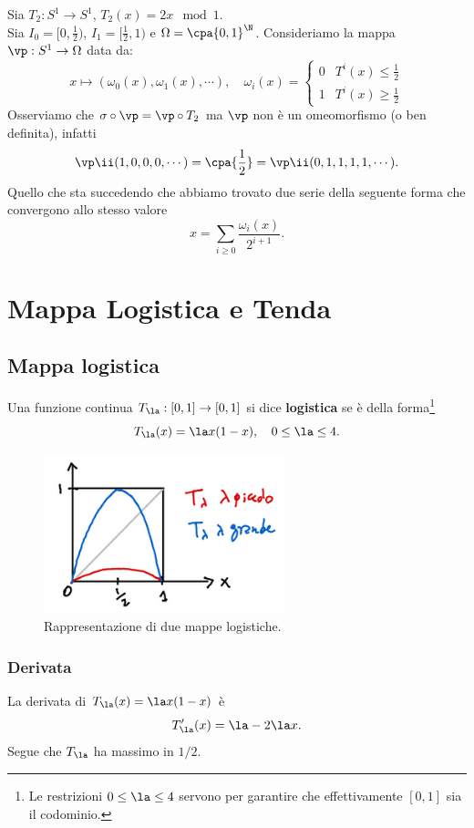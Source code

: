 \begin{example}
Sia $T_2:S^1\to S^1$, $T_2(x)=2x\mod 1$.\\
Sia $I_0=[0,\frac12)$, $I_1=[\frac12,1)$ e $\Omega=\cpa{0,1}^\N$. Consideriamo la mappa $\vp:S^1\to \Omega$ data da:
\[x\mapsto (\omega_0(x),\omega_1(x),\cdots),\quad \omega_i(x)=\begin{cases}
0 & T^i(x)\leq \frac12\\
1 & T^i(x)\geq\frac12
\end{cases}\]
Osserviamo che $\sigma\circ \vp=\vp\circ T_2$ ma $\vp$ non \`e un omeomorfismo (o ben definita), infatti
\[\vp\ii(1,0,0,0,\cdots)=\cpa{\frac12}=\vp\ii(0,1,1,1,1,\cdots).\]
Quello che sta succedendo che abbiamo trovato due serie della seguente forma che convergono allo stesso valore
\[x=\sum_{i\geq 0}\frac{\omega_i(x)}{2^{i+1}}.\]
\end{example}


\section{Mappa Logistica e Tenda}
\subsection{Mappa logistica} 
\begin{definition}
Una funzione continua $T_\la:[0,1]\to[0,1]$ si dice \textbf{logistica} se \`e della forma\footnote{Le restrizioni $0\leq \la\leq 4$ servono per garantire che effettivamente $[0,1]$ sia il codominio.}
\[T_\la(x)=\la x(1-x),\quad 0\leq \la\leq 4.\]
\end{definition}

\begin{figure}[!htb]
    \centering
    \includegraphics[width=7cm]{Immagini/Logistica.png}
    \caption{Rappresentazione di due mappe logistiche.}
\end{figure}

\subsubsection{Derivata}
La derivata di $T_\la(x)=\la x(1-x)$ \`e
\[T'_\la(x)=\la-2\la x.\]
Segue che $T_\la$ ha massimo in $1/2$.
